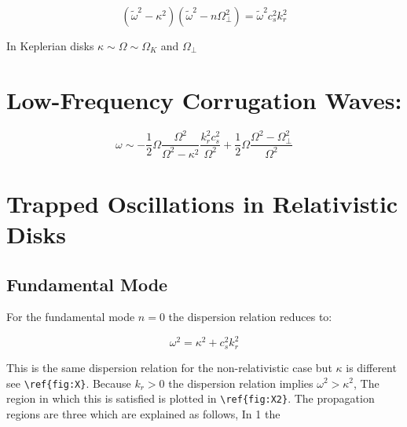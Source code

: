\begin{equation}
(\tilde{\omega}^2 - \kappa^2)(\tilde{\omega}^2 - n\Omega_{\bot}^2 ) =
\tilde{\omega}^2 c_s^2 k_r^2
\end{equation}

In Keplerian disks $\kappa \sim \Omega \sim \Omega_K$ and
$\Omega_{\bot}$ 

\section{Low-Frequency Corrugation Waves:}

\begin{equation}
\omega \sim -\dfrac{1}{2} \Omega \dfrac{\Omega^2}{\Omega^2 -
\kappa^2} \dfrac{k_r^2 c_s^2 }{\Omega^2} + \dfrac{1}{2} \Omega
\dfrac{\Omega^2 - \Omega_{\bot}^2}{\Omega^2}
\end{equation}


\section{Trapped Oscillations in Relativistic Disks}

\subsection{Fundamental Mode}

For the fundamental mode $n=0$ the dispersion relation reduces to:

\begin{equation}
\omega^2 = \kappa^2 + c_s^2k_r^2
\end{equation}

This is the same dispersion relation for the non-relativistic
case but $\kappa$ is different see \verb+\ref{fig:X}+.
Because $k_r > 0$ the dispersion relation implies $\omega^2 >
\kappa^2$, The region in which this is satisfied is plotted in 
\verb+\ref{fig:X2}+. The propagation regions are three which
are explained as follows, In 1 the 


